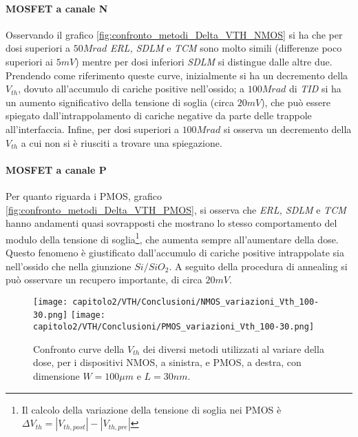 \paragraph*{MOSFET a canale N} Osservando il grafico \ref{fig:confronto_metodi_Delta_VTH_NMOS} si ha che per dosi superiori a $50 Mrad$ \textit{ERL, SDLM} e \textit{TCM} sono molto simili (differenze poco superiori ai $5mV$) mentre per dosi inferiori \textit{SDLM} si distingue dalle altre due. Prendendo come riferimento queste curve, inizialmente si ha un decremento della $V_{th}$, dovuto all'accumulo di cariche positive nell'ossido; a $100Mrad$ di \emph{TID} si ha un aumento significativo della tensione di soglia (circa $20mV$), che può essere spiegato dall'intrappolamento di cariche negative da parte delle trappole all'interfaccia. Infine, per dosi superiori a $100Mrad$ si osserva un decremento della $V_{th}$ a cui non si è riusciti a trovare una spiegazione. 

\paragraph*{MOSFET a canale P} Per quanto riguarda i PMOS, grafico \ref{fig:confronto_metodi_Delta_VTH_PMOS}, si osserva che \textit{ERL, SDLM} e \textit{TCM} hanno andamenti quasi sovrapposti che mostrano lo stesso comportamento del modulo della tensione di soglia\footnote{Il calcolo della variazione della tensione di soglia nei PMOS è $\Delta V_{th} = |V_{th,post}| - |V_{th,pre}|$}, che aumenta sempre all'aumentare della dose. Questo fenomeno è giustificato dall'accumulo di cariche positive intrappolate sia nell'ossido che nella giunzione $Si/SiO_2$. A seguito della procedura di annealing si può osservare un recupero importante, di circa $20mV$.

\begin{figure}[ht]

  \centering
  \texttt{[image: capitolo2/VTH/Conclusioni/NMOS\_variazioni\_Vth\_100-30.png]}
  \texttt{[image: capitolo2/VTH/Conclusioni/PMOS\_variazioni\_Vth\_100-30.png]}

  \caption[Confronto curve della $V_{th}$ dei diversi metodi utilizzati al variare della dose]{Confronto curve della $V_{th}$ dei diversi metodi utilizzati al variare della dose, per i dispositivi NMOS, a sinistra, e PMOS, a destra, con dimensione $ W=100\mu m$ e $L = 30nm$.}
  \label{fig:confronto_metodi_VTH}
  
\end{figure}

